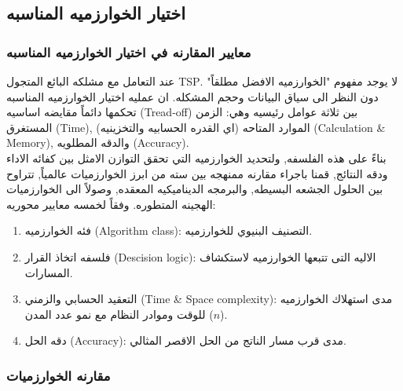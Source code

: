 \documentclass{article}
\newcommand{\en}[1]{\textenglish{#1}}
\begin{document}
\subsection{اختيار الخوارزميه المناسبه}
\subsubsection{معايير المقارنه في اختيار الخوارزميه المناسبه}
عند التعامل مع مشلكه البائع المتجول \en{TSP}. لا يوجد مفهوم "الخوارزميه الافضل مطلقاً" دون النظر الى سياق البيانات وحجم المشكله. 
ان عمليه اختيار الخوارزميه المناسبه تحكمها دائماً مقايضه اساسيه (\en{Tread-off}) 
بين ثلاثة عوامل رئيسيه وهي: الزمن المستغرق (\en{Time}),
الموارد المتاحه (اي القدره الحسابيه والتخزينيه) (\en{Calculation \& Memory}), 
والدقه المطلويه (\en{Accuracy}). \\

بناءً على هذه الفلسفه, ولتحديد الخوارزميه التي تحقق التوازن الامثل بين كفائه الاداء ودقه النتائج,
قمنا باجراء مقارنه ممنهجه بين سته من ابرز الخوارزميات عالمياً, تتراوح بين الحلول الجشعه البسيطه, والبرمجه الديناميكيه المعقده, وصولاً الى الخوارزميات الهجينه المتطوره. وفقاً لخمسه معايير محوريه:

\begin{enumerate}
	\item فئه الخوارزميه (\en{Algorithm class}):
التصنيف البنيوي للخوارزميه.

	\item فلسفه اتخاذ القرار  (\en{Descision logic}):
الاليه التى تتبعها الخوارزميه لاستكشاف المسارات.

	\item التعقيد الحسابي والزمني (\en{Time \& Space complexity}):
مدى استهلاك الخوارزميه للوقت وموادر النظام مع نمو عدد المدن ($n$).

	\item دقه الحل (\en{Accuracy}):
مدى قرب مسار الناتج من الحل الاقصر المثالي.
\end{enumerate}

\subsubsection{مقارنه الخوارزميات}
\end{document}
